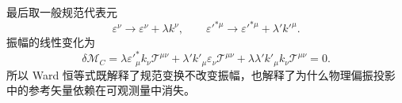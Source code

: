 \begin{exbox}
最后取一般规范代表元
\begin{equation*}
 \varepsilon^\nu\to\varepsilon^\nu+\lambda k^\nu,
 \qquad
 \varepsilon'^{*\mu}\to\varepsilon'^{*\mu}+\lambda' k'^{\mu}.
\end{equation*}
振幅的线性变化为
\begin{equation*}
 \delta\mathcal M_C
 =\lambda\varepsilon'^{*}_{\mu}k_\nu\mathcal T^{\mu\nu}
 +\lambda'k'_\mu\varepsilon_\nu\mathcal T^{\mu\nu}
 +\lambda\lambda'k'_\mu k_\nu\mathcal T^{\mu\nu}=0.
\end{equation*}
所以 Ward 恒等式既解释了规范变换不改变振幅，也解释了为什么物理偏振投影中的参考矢量依赖在可观测量中消失。
\end{exbox}


